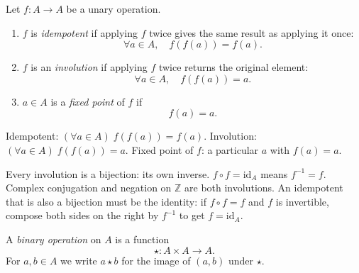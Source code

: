 \begin{tcolorbox}[colback=propbox, colframe=propborder, arc=2pt,
  left=6pt, right=6pt, top=4pt, bottom=4pt,
  title={\small\textbf{Definition (Properties of Unary Operations)}},
  fonttitle=\small\bfseries]
\label{def:unary-laws}
Let $f : A \to A$ be a unary operation.
\begin{enumerate}[label=(\roman*)]
  \item $f$ is \emph{idempotent} if applying $f$ twice gives the same
        result as applying it once:
        \[
          \forall a \in A,\quad f(f(a)) = f(a).
        \]
  \item $f$ is an \emph{involution} if applying $f$ twice returns the
        original element:
        \[
          \forall a \in A,\quad f(f(a)) = a.
        \]
  \item $a \in A$ is a \emph{fixed point} of $f$ if
        \[
          f(a) = a.
        \]
\end{enumerate}
\end{tcolorbox}

\begin{remark}
Idempotent: $(\forall a \in A)\; f(f(a)) = f(a)$.
\quad
Involution: $(\forall a \in A)\; f(f(a)) = a$.
\quad
Fixed point of $f$: a particular $a$ with $f(a) = a$.
\end{remark}

\begin{remark}
Every involution is a bijection: its own inverse.
$f \circ f = \mathrm{id}_A$ means $f^{-1} = f$.
Complex conjugation and negation on $\mathbb{Z}$ are both involutions.
An idempotent that is also a bijection must be the identity:
if $f \circ f = f$ and $f$ is invertible, compose both sides on the right
by $f^{-1}$ to get $f = \mathrm{id}_A$.
\end{remark}


\begin{tcolorbox}[colback=propbox, colframe=propborder, arc=2pt,
  left=6pt, right=6pt, top=4pt, bottom=4pt,
  title={\small\textbf{Definition (Binary Operation)}},
  fonttitle=\small\bfseries]
\label{def:binary-op}
A \emph{binary operation} on $A$ is a function
\[
  \star : A \times A \to A.
\]
For $a, b \in A$ we write $a \star b$ for the image of $(a, b)$ under
$\star$.
\end{tcolorbox}


